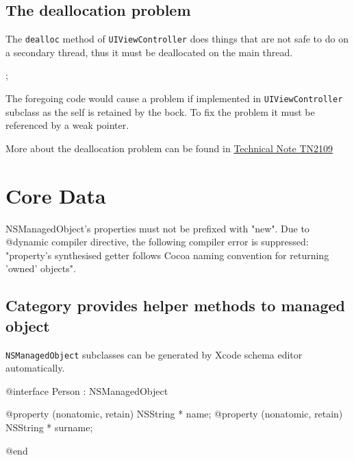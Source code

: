 \documentclass[10pt]{extarticle}
\newenvironment{tiplisting}
{\small\mdframed[middlelinewidth=0.5pt, middlelinecolor=GoldenDreamColor, skipabove=15pt]{\textbf{Tip:}}}
{\endmdframed\vspace{12pt}\normalsize}
\newenvironment{importantlisting}
{\mdframed[middlelinewidth=0.5pt, middlelinecolor=MatisseColor, skipabove=15pt]{\textbf{Important:}}}
{\endmdframed\vspace{12pt}}
\newcommand{\inlinecode}[1]{{\textcolor{TundoraColor}{\texttt{#1}}}}
\begin{document}
\subsection{The deallocation problem}

The \inlinecode{dealloc} method of \inlinecode{UIViewController} does things that are not safe to do on a secondary thread, thus it must be deallocated on the main thread.

\begin{codelisting}
;
\end{codelisting}

The foregoing code would cause a problem if implemented in \inlinecode{UIViewController} subclass as the self is retained by the bock. To fix the problem it must be referenced by a weak pointer.

\begin{tiplisting}
More about the deallocation problem can be found in \href{https://developer.apple.com/library/ios/technotes/tn2109}{Technical Note TN2109}
\end{tiplisting}


\section{Core Data}


\begin{importantlisting}
NSManagedObject's properties must not be prefixed with "new". Due to @dynamic compiler directive, the following compiler error is suppressed: "property's synthesised getter follows Cocoa naming convention for returning 'owned' objects".
\end{importantlisting}


\subsection{Category provides helper methods to managed object}

\inlinecode{NSManagedObject} subclasses can be generated by Xcode schema editor automatically.

\begin{codelisting}
@interface Person : NSManagedObject

@property (nonatomic, retain) NSString * name;
@property (nonatomic, retain) NSString * surname;

@end
\end{codelisting}
\end{document}
